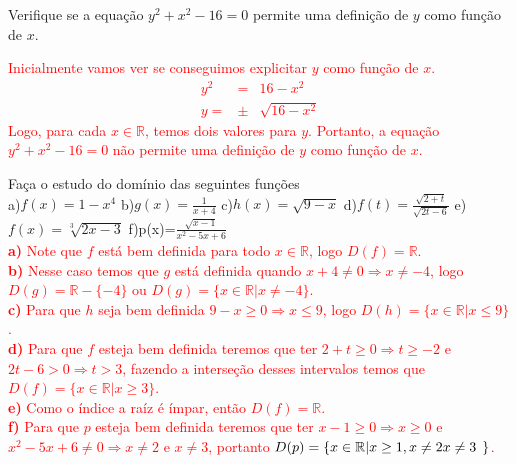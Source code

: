\begin{exe} Verifique se a equação $y^2+x^2-16=0$ permite uma definição de $y$ como função de $x$.
\end{exe}
\textcolor{red}{Inicialmente vamos ver se conseguimos explicitar $y$ como função de $x$.
\begin{eqnarray*}
y^2 &=&16-x^2 \\
y= &\pm &\sqrt{16-x^2}
\end{eqnarray*}
Logo, para cada $x \in \mathbb{R}$, temos dois valores para $y$. Portanto, a equação $y^2+x^2-16=0$ não permite uma definição de $y$ como função de $x$.}
\begin{exe}
Faça o estudo do domínio das seguintes funções \\
a)$f(x)=1-x^4$ \hspace{1cm}    b)$g(x)=\frac{1}{x+4}$  \hspace{1cm}      c)$h(x)=\sqrt{9-x}$  \hspace{1cm} d)$f(t)=\frac{\sqrt{2+t}}{\sqrt{2t-6}}$   \hspace{1cm}  e)$f(x)=\sqrt[3]{2x-3}$  \hspace{1cm} f)p(x)=$\frac{\sqrt{x-1}}{x^2-5x+6}$ \hspace{1cm} \\ %
\textcolor{red}{\textbf{a)} Note que $f$ está bem definida para todo $x \in \mathbb{R}$, logo $D(f)= \mathbb{R}$. \\
\textbf{b)} Nesse caso temos que $g$ está definida quando $x+4 \neq 0 \Rightarrow x \neq -4$, logo $D(g)= \mathbb{R}-\{-4\}$ ou $D(g)= \{ x \in \mathbb{R}| x \neq -4 \}$. \\
\textbf{c)} Para que $h$ seja bem definida $9-x \geq 0 \Rightarrow  x \leq 9 $, logo $D(h)= \{ x \in \mathbb{R}| x \leq 9 \}$. \\
\textbf{d)} Para que $f$ esteja bem definida teremos que ter $2+t \geq 0 \Rightarrow t \geq -2$ e $2t-6 >0 \Rightarrow t>3$, fazendo a interseção desses intervalos temos que $D(f)= \{ x \in \mathbb{R}| x \geq 3 \}$. \\
\textbf{e)} Como o índice a raíz é ímpar, então $D(f)= \mathbb{R}$. \\
\textbf{f)} Para que $p$ esteja bem definida teremos que ter $x-1 \geq 0 \Rightarrow x \geq 0$ e $x^2-5x+6 \neq 0 \Rightarrow x \neq 2$ e $x \neq 3$, portanto $D(p)= \{ x \in \mathbb{R}| x \geq 1, x \neq 2 \hspace{0,15cm x \neq 3} \}$.
}
\end{exe}

